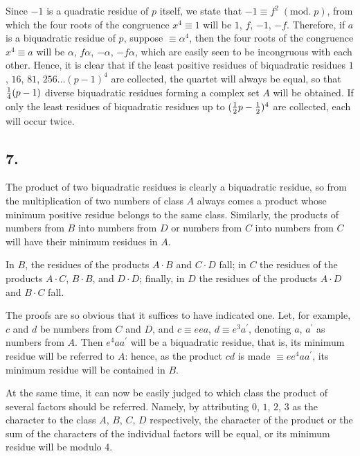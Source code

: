\documentclass[twoside,12pt, showframe]{memoir}
\renewcommand{\pmod}[1]{\;(\textrm{mod.}\;#1)}
\let\oldfrac\frac
\def\frac#1#2{\mathchoice{\tfrac{#1}{#2}}{\oldfrac{#1}{#2}}{\genfrac{}{}{}{2}{#1}{#2\mathstrut}}{\genfrac{}{}{}{3}{#1}{#2\mathstrut}}}
\begin{document}
Since \(-1\) is a quadratic residue of \(p\) itself, we state that \(-1 \equiv f^2\pmod{p}\), from which the four roots of the congruence \(x^{4} \equiv 1\) will be \(1\), \(f\), \(-1\), \(-f\). Therefore, if \(a\) is a biquadratic residue of \(p\), suppose \(\equiv \alpha^{4}\), then the four roots of the congruence \(x^{4} \equiv a\) will be \(\alpha\), \(f \alpha\), \(-\alpha\), \(-f \alpha\), which are easily seen to be incongruous with each other. Hence, it is clear that if the least positive residues of biquadratic residues \(1\), \(16\), \(81\), \(256 \ldots (p-1)^{4}\) are collected, the quartet will always be equal, so that \(\frac{1}{4}(p-1)\) diverse biquadratic residues forming a complex set \(A\) will be obtained. If only the least residues of biquadratic residues up to \((\frac{1}{2} p-\frac{1}{2})^{4}\) are collected, each will occur twice.
%

\subsection*{7.}

The product of two biquadratic residues is clearly a biquadratic residue, so from the multiplication of two numbers of class \(A\) always comes a product whose minimum positive residue belongs to the same class. Similarly, the products of numbers from \(B\) into numbers from \(D\) or numbers from \(C\) into numbers from \(C\) will have their minimum residues in \(A\).

In \(B\), the residues of the products \(A \cdot B\) and \(C \cdot D\) fall; in \(C\) the residues of the products \(A \cdot C\), \(B \cdot B\), and \(D \cdot D\); finally, in \(D\) the residues of the products \(A \cdot D\) and \(B \cdot C\) fall.

The proofs are so obvious that it suffices to have indicated one. Let, for example, \(c\) and \(d\) be numbers from \(C\) and \(D\), and \(c \equiv e ea\), \(d \equiv e^{3} a^{\prime}\), denoting \(a\), \(a^{\prime}\) as numbers from \(A\). Then \(e^{4} a a^{\prime}\) will be a biquadratic residue, that is, its minimum residue will be referred to \(A\): hence, as the product \(c d\) is made \(\equiv e e^{4} a a^{\prime}\), its minimum residue will be contained in \(B\).

At the same time, it can now be easily judged to which class the product of several factors should be referred. Namely, by attributing \(0\), \(1\), \(2\), \(3\) as the character to the class \(A\), \(B\), \(C\), \(D\) respectively, the character of the product or the sum of the characters of the individual factors will be equal, or its minimum residue will be modulo 4.
%
\end{document}
